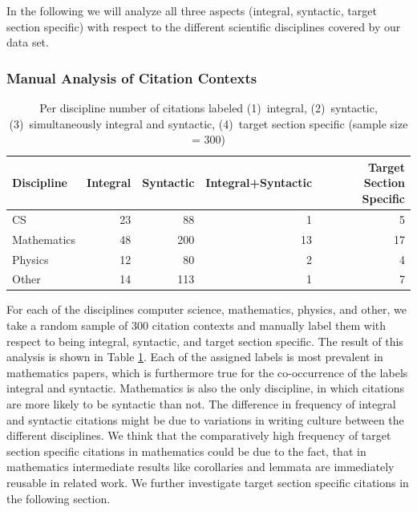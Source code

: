In the following we will analyze all three aspects (integral, syntactic, target section specific) with respect to the different scientific disciplines covered by our data set.

\subsubsection{Manual Analysis of Citation Contexts}

\begin{table}[tb]
\centering
  \caption[Per discipline number of citations labeled integral, syntactic, imultaneously integral and syntactic, target section specific]{Per discipline number of citations labeled (1)~integral, (2)~syntactic, (3)~simultaneously integral and syntactic, (4)~target section specific (sample size = 300)}
  \label{tbl:integralsyntacticsecspec}
\begin{small}
\begin{tabular}{lrrrr}
\toprule
   Discipline & Integral & Syntactic & Integral+Syntactic & Target Section Specific \\
   \midrule
   CS & 23 & 88 & 1 & 5 \\
   Mathematics & 48 & 200 & 13 & 17 \\
   Physics & 12 & 80 & 2 & 4 \\
   Other & 14 & 113 & 1 & 7 \\
  \bottomrule
\end{tabular}
\end{small}
\end{table}

For each of the disciplines computer science, mathematics, physics, and other, we take a random sample of 300 citation contexts and manually label them with respect to being integral, syntactic, and target section specific. The result of this analysis is shown in Table \ref{tbl:integralsyntacticsecspec}. Each of the assigned labels is most prevalent in mathematics papers, which is furthermore true for the co-occurrence of the labels integral and syntactic. Mathematics is also the only discipline, in which citations are more likely to be syntactic than not. The difference in frequency of integral and syntactic citations might be due to variations in writing culture between the different disciplines. We think that the comparatively high frequency of target section specific citations in mathematics could be due to the fact, that in mathematics intermediate results like corollaries and lemmata are immediately reusable in related work. We further investigate target section specific citations in the following section.

